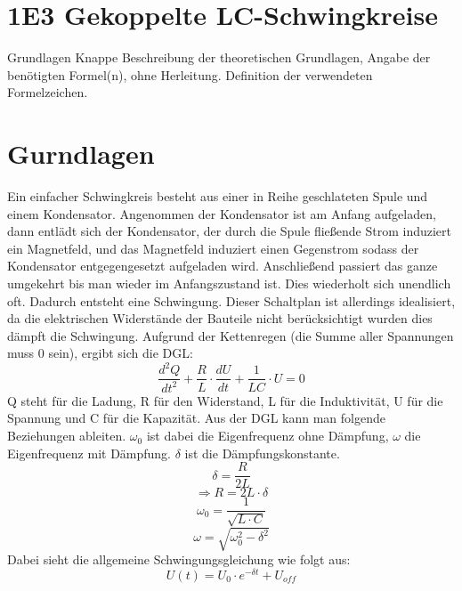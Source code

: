 \documentclass[twoside]{protokoll}
\begin{document}
 
\section{1E3 Gekoppelte LC-Schwingkreise}

\begin{aufgabe}{Grundlagen}
  Knappe Beschreibung der theoretischen Grundlagen, Angabe der
  benötigten Formel(n), ohne Herleitung. Definition der verwendeten
  Formelzeichen.
\end{aufgabe}
\section{Gurndlagen}
Ein einfacher Schwingkreis besteht aus einer in Reihe geschlateten Spule und einem Kondensator.
Angenommen der Kondensator ist am Anfang aufgeladen,
dann entlädt sich der Kondensator, der durch die Spule fließende Strom induziert ein Magnetfeld, und das Magnetfeld induziert einen Gegenstrom sodass der Kondensator entgegengesetzt aufgeladen wird.
Anschließend passiert das ganze umgekehrt bis man wieder im Anfangszustand ist. Dies wiederholt sich unendlich oft.
Dadurch entsteht eine Schwingung.
Dieser Schaltplan ist allerdings idealisiert, da die elektrischen Widerstände der Bauteile nicht berücksichtigt wurden dies dämpft die Schwingung.
Aufgrund der Kettenregen (die Summe aller Spannungen muss 0 sein), ergibt sich die DGL:
\begin{equation}
    \frac{d^2 Q}{dt^2} + \frac{R}{L} \cdot \frac{d U}{dt} + \frac{1}{LC} \cdot U = 0
\end{equation}
Q steht für die Ladung, R für den Widerstand, L für die Induktivität, U für die Spannung und C für die Kapazität. 
Aus der DGL kann man folgende Beziehungen ableiten. $\omega_0$ ist dabei die Eigenfrequenz ohne Dämpfung, $\omega$ die Eigenfrequenz mit Dämpfung.
$\delta$ ist die Dämpfungskonstante.
\begin{equation}
    \delta = \frac{R}{2L}
\end{equation}
\begin{equation}
    \Rightarrow R = 2 L \cdot \delta
\end{equation}
\begin{equation}
    \omega_0 = \frac{1}{\sqrt{L \cdot C}}
\end{equation}
\begin{equation}
    \omega = \sqrt{\omega_0^2 - \delta^2}
\end{equation}
Dabei sieht die allgemeine Schwingungsgleichung wie folgt aus:
\begin{equation}
    U(t) = U_0 \cdot e ^ {-\delta t} + U_{off}
\end{equation}
\end{document}
